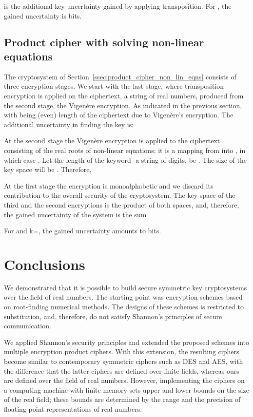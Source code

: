\documentclass[10pt,journal]{IEEEtran}
\begin{document}
is the additional key uncertainty gained by applying transposition. For , the 
gained uncertainty is  bits.

\subsection{Product cipher with solving non-linear equations}
The cryptosystem of Section~\ref{ssec:product_cipher_non_lin_eqns} consists
of three encryption stages. We start with the last stage, where transposition 
encryption is applied on the ciphertext, a string of real numbers, produced from 
the second stage, the Vigen\`ere encryption. As indicated in the previous section,
with  being (even) length of the ciphertext due to Vigen\`ere's encryption.
The additional uncertainty in finding the key is:

\newline

At the second stage the Vigen\`ere encryption is applied to the ciphertext 
consisting of the real roots of non-linear equations; it is a mapping
from  into , in which case .
Let the length of the keyword- a string of digits, be . The size of the key space 
will be . Therefore,  
\newline

At the first stage the encryption is monoalphabetic and we discard its 
contribution to the overall security of the cryptosystem. The key space of the 
third and the second encryptions is the product of both spaces, and, therefore,
the gained uncertainty of the system is the sum 


For  and k=, the gained uncertainty amounts to  bits.

\section{Conclusions} \label{sec:conc}
We demonstrated that it is possible to build secure symmetric key
cryptosystems over the field of real numbers. The starting
point was encryption schemes based on root-finding numerical methods. 
The designs of these schemes is restricted to substitution, and, therefore, 
do not satisfy Shannon's principles of secure communication.
\newline

We applied Shannon's security principles and extended the proposed schemes into 
multiple encryption product ciphers. With this extension, the resulting ciphers 
become similar to contemporary symmetric ciphers such as DES and AES,
with the difference that the latter ciphers are defined over finite fields, whereas 
ours are defined over the field of real numbers. However, implementing the 
ciphers on a computing machine with finite memory sets upper and lower 
bounds on the size of the real field; these bounds are determined by the 
range and the precision of floating point representations of real numbers. 
\newline
\end{document}

